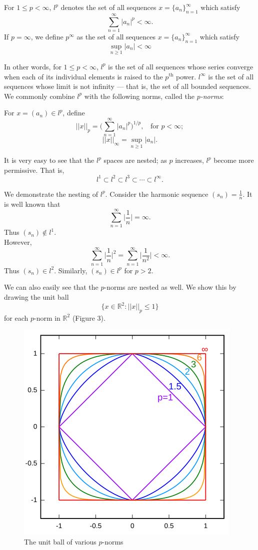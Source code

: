 \begin{defn}
For $1 \leq p < \infty$, $l^p$ denotes the set of all sequences $x = \{a_n\}_{n=1}^{\infty}$ which satisfy
\[\sum_{n=1}^{\infty} |a_n|^p < \infty.\]
If $p = \infty$, we define $p^{\infty}$ as the set of all sequences $x = \{a_n\}_{n=1}^{\infty}$ which satisfy
\[\sup_{n \geq 1} |a_n| < \infty\]
\end{defn}

In other words, for $1 \leq p < \infty$, $l^p$ is the set of all sequences whose series converge when each of its individual elements is raised to the $p^{\textrm{th}}$ power.  $l^{\infty}$ is the set of all sequences whose limit is not infinity --- that is, the set of all bounded sequences.  We commonly combine $l^p$ with the following norms, called the \textit{$p$-norms}:

For $x = (a_n) \in l^p$, define
\[||x||_p = \biggl(\sum_{n=1}^{\infty}|a_n|^p\biggr)^{1/p}, \;\; \textrm{ for } p < \infty;\]
\[||x||_{\infty} = \sup_{n \geq 1} |a_n|.\]

It is very easy to see that the $l^p$ spaces are nested; as $p$ increases, $l^p$ become more permissive.  That is, 
\[l^1 \subset l^2 \subset l^3 \subset \cdots \subset l^{\infty}.\]

\begin{example}
We demonstrate the nesting of $l^p$.
Consider the harmonic sequence $(s_n) = \frac{1}{n}$.  It is well known that
\[\sum_{n=1}^{\infty} \biggl|\frac{1}{n}\biggr| = \infty.\]
Thus $(s_n) \notin l^1$.\\
However, 
\[\sum_{n=1}^{\infty} \biggl|\frac{1}{n}\biggr|^2 = \sum_{n=1}^{\infty} \biggl|\frac{1}{n^2}\biggr| < \infty.\]
Thus $(s_n) \in l^2$.  Similarly, $(s_n) \in l^p$ for $p > 2$.
\end{example}

We can also easily see that the $p$-norms are nested as well.  We show this by drawing the unit ball
\[\{x \in \mathbb{R}^2 : ||x||_p \leq 1\}\]
for each $p$-norm in $\mathbb{R}^2$ (Figure 3).

\begin{figure}[h]
\centering
\includegraphics[scale=0.5]{images/p-norms.png}
\caption{The unit ball of various $p$-norms \cite{pnormpic}}
\end{figure}

